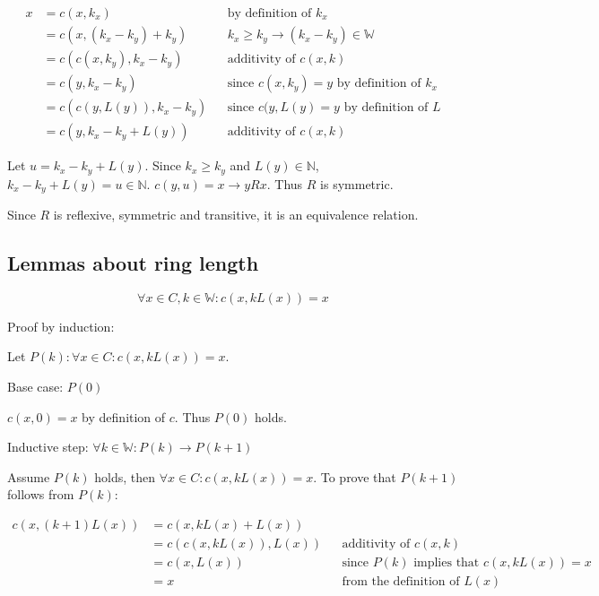 \documentclass[11pt]{article}
\begin{document}
    \begin{align*}
        \text{$x$} &= \text{$c(x,k_{x})$} && \text{by definition of $k_{x}$} \\
        &= \text{$c(x,(k_{x}-k_{y})+k_{y})$} && \text{$k_{x}\geq k_{y} \rightarrow (k_{x}-k_{y}) \in \mathbb{W}$} \\
        &= \text{$c(c(x,k_{y}),k_{x}-k_{y})$} && \text{additivity of $c(x,k)$} \\
        &= \text{$c(y,k_{x}-k_{y})$} && \text{since $c(x,k_{y})=y$ by definition of $k_{x}$} \\
        &= \text{$c(c(y,L(y)),k_{x}-k_{y})$} && \text{since $c(y,L(y)=y$ by definition of $L$} \\
        &= \text{$c(y,k_{x}-k_{y}+L(y))$} && \text{additivity of $c(x,k)$}
    \end{align*}

    Let $u=k_{x}-k_{y}+L(y)$. Since $k_{x}\geq k_{y}$ and $L(y) \in \mathbb{N}$, $k_{x}-k_{y}+L(y)=u \in \mathbb{N}$. $c(y,u)=x \rightarrow yRx$. Thus $R$ is symmetric.

    Since $R$ is reflexive, symmetric and transitive, it is an equivalence relation.

    \subsection{Lemmas about ring length}

    \begin{equation}
        \forall x \in C, k \in \mathbb{W}: c(x,kL(x)) = x
    \end{equation}

    Proof by induction:

    Let $P(k): \forall x \in C: c(x,kL(x)) = x$.

    Base case: $P(0)$

    $c(x,0) = x$ by definition of $c$. Thus $P(0)$ holds.

    Inductive step: $\forall k \in \mathbb{W}: P(k) \rightarrow P(k+1)$

    Assume $P(k)$ holds, then $\forall x \in C: c(x,kL(x))=x$. To prove that $P(k+1)$ follows from $P(k)$:

    \begin{align*}
        \text{$c(x,(k+1)L(x))$} &= \text{$c(x,kL(x)+L(x))$} && \text{} \\
        &= \text{$c(c(x,kL(x)),L(x))$} && \text{additivity of $c(x,k)$} \\
        &= \text{$c(x,L(x))$} && \text{since $P(k)$ implies that $c(x,kL(x))=x$} \\
        &= \text{$x$} && \text{from the definition of $L(x)$}
    \end{align*}
\end{document}
